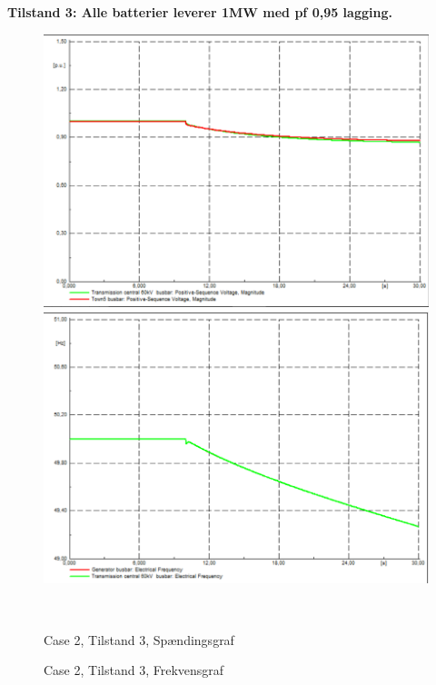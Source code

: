 \textbf{Tilstand 3: Alle batterier leverer 1MW med pf 0,95 lagging.}
\begin{figure}[H]
	\centering
	\begin{minipage}[b]{0.48\textwidth}
		\centering
		\includegraphics[width=1.00\textwidth]{figurer/LargeDisturbance/Voltage3} %
	\end{minipage}
	\hfill
	\begin{minipage}[b]{0.48\textwidth}
		\centering
		\includegraphics[width=1.00\textwidth]{figurer/LargeDisturbance/Freq3} %
	\end{minipage}
	\\ %
	\begin{minipage}[t]{0.48\textwidth}
		\caption{Case 2, Tilstand 3, Spændingsgraf} %
		\label{fig:C2T3V}
	\end{minipage}
	\hfill
	\begin{minipage}[t]{0.48\textwidth}
		\caption{Case 2, Tilstand 3, Frekvensgraf} %
		\label{fig:C2T3F}
	\end{minipage}
\end{figure}

